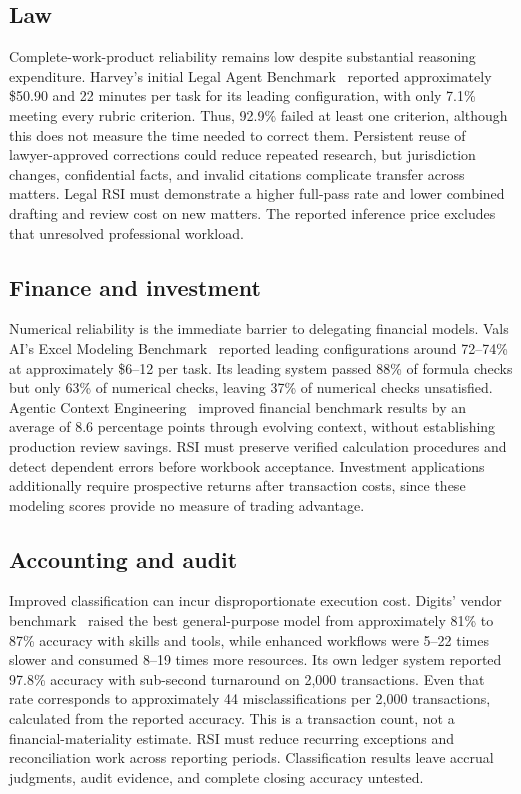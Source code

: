 \subsection{Law}
Complete-work-product reliability remains low despite substantial reasoning expenditure. Harvey's initial Legal Agent Benchmark~\cite{harvey2026lab} reported approximately \$50.90 and 22 minutes per task for its leading configuration, with only 7.1\% meeting every rubric criterion. Thus, 92.9\% failed at least one criterion, although this does not measure the time needed to correct them. Persistent reuse of lawyer-approved corrections could reduce repeated research, but jurisdiction changes, confidential facts, and invalid citations complicate transfer across matters. Legal RSI must demonstrate a higher full-pass rate and lower combined drafting and review cost on new matters. The reported inference price excludes that unresolved professional workload.

\subsection{Finance and investment}
Numerical reliability is the immediate barrier to delegating financial models. Vals AI's Excel Modeling Benchmark~\cite{vals2026excel} reported leading configurations around 72--74\% at approximately \$6--12 per task. Its leading system passed 88\% of formula checks but only 63\% of numerical checks, leaving 37\% of numerical checks unsatisfied. Agentic Context Engineering~\cite{zhang2025ace} improved financial benchmark results by an average of 8.6 percentage points through evolving context, without establishing production review savings. RSI must preserve verified calculation procedures and detect dependent errors before workbook acceptance. Investment applications additionally require prospective returns after transaction costs, since these modeling scores provide no measure of trading advantage.

\subsection{Accounting and audit}
Improved classification can incur disproportionate execution cost. Digits' vendor benchmark~\cite{digits2026benchmark} raised the best general-purpose model from approximately 81\% to 87\% accuracy with skills and tools, while enhanced workflows were 5--22 times slower and consumed 8--19 times more resources. Its own ledger system reported 97.8\% accuracy with sub-second turnaround on 2,000 transactions. Even that rate corresponds to approximately 44 misclassifications per 2,000 transactions, calculated from the reported accuracy. This is a transaction count, not a financial-materiality estimate. RSI must reduce recurring exceptions and reconciliation work across reporting periods. Classification results leave accrual judgments, audit evidence, and complete closing accuracy untested.

